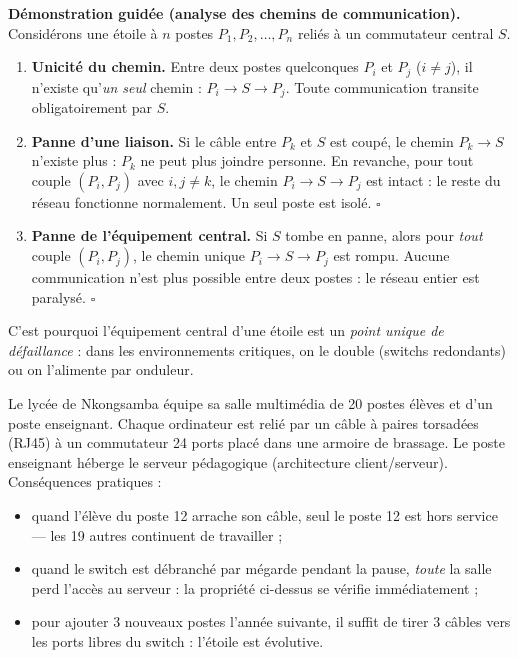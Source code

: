 \documentclass[11pt]{article}
\begin{document}
\textbf{Démonstration guidée (analyse des chemins de communication).} Considérons une étoile à $n$ postes $P_1, P_2, \dots, P_n$ reliés à un commutateur central $S$.
\begin{enumerate}
\item \textbf{Unicité du chemin.} Entre deux postes quelconques $P_i$ et $P_j$ ($i \neq j$), il n'existe qu'\emph{un seul} chemin : $P_i \rightarrow S \rightarrow P_j$. Toute communication transite obligatoirement par $S$.
\item \textbf{Panne d'une liaison.} Si le câble entre $P_k$ et $S$ est coupé, le chemin $P_k \rightarrow S$ n'existe plus : $P_k$ ne peut plus joindre personne. En revanche, pour tout couple $(P_i, P_j)$ avec $i, j \neq k$, le chemin $P_i \rightarrow S \rightarrow P_j$ est intact : le reste du réseau fonctionne normalement. Un seul poste est isolé. \hfill $\square$
\item \textbf{Panne de l'équipement central.} Si $S$ tombe en panne, alors pour \emph{tout} couple $(P_i, P_j)$, le chemin unique $P_i \rightarrow S \rightarrow P_j$ est rompu. Aucune communication n'est plus possible entre deux postes : le réseau entier est paralysé. \hfill $\square$
\end{enumerate}
C'est pourquoi l'équipement central d'une étoile est un \emph{point unique de défaillance} : dans les environnements critiques, on le double (switchs redondants) ou on l'alimente par onduleur.

\begin{exemplebox}
Le lycée de Nkongsamba équipe sa salle multimédia de 20 postes élèves et d'un poste enseignant. Chaque ordinateur est relié par un câble à paires torsadées (RJ45) à un commutateur 24 ports placé dans une armoire de brassage. Le poste enseignant héberge le serveur pédagogique (architecture client/serveur). Conséquences pratiques :
\begin{itemize}
\item quand l'élève du poste 12 arrache son câble, seul le poste 12 est hors service — les 19 autres continuent de travailler ;
\item quand le switch est débranché par mégarde pendant la pause, \emph{toute} la salle perd l'accès au serveur : la propriété ci-dessus se vérifie immédiatement ;
\item pour ajouter 3 nouveaux postes l'année suivante, il suffit de tirer 3 câbles vers les ports libres du switch : l'étoile est évolutive.
\end{itemize}
\end{exemplebox}
\end{document}
